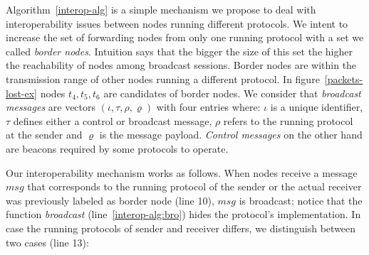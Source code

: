 Algorithm~\ref{interop-alg} is a simple mechanism we propose to deal with interoperability issues between nodes running different protocols.
%
We intent to increase the set of forwarding nodes from only one running protocol with a set we called \textit{border nodes}.
%
Intuition says that the bigger the size of this set the higher the reachability of nodes among broadcast sessions.
%
Border nodes are within the transmission range of other nodes running a different protocol.
%
In figure~\ref{packets-lost-ex} nodes $t_{4}, t_{5}, t_{6}$ are candidates of border nodes.
%
We consider that \emph{broadcast messages} are vectors $(\iota, \tau, \rho, \varrho)$ with four entries where: $\iota$ is a unique identifier, $\tau$ defines either a control or broadcast message, $\rho$ refers to the running protocol at the sender and $\varrho$ is the message payload.
%
\emph{Control messages} on the other hand are beacons required by some protocols to operate.

Our interoperability mechanism works as follows.
%
When nodes receive a message $msg$ that corresponds to the running protocol of the sender or the actual receiver was previously labeled as border node (line 10), $msg$ is broadcast; notice that the function \textit{broadcast} (line~\ref{interop-alg:bro}) hides the protocol's implementation.
%
In case the running protocols of sender and receiver differs, we distinguish between two cases (line 13):

